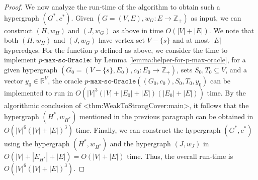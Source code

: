 \documentclass{article}
\def\Cref#1{<#1>}%
\newcommand{\functionMaximizationOracleStrongCover}[1]{\ensuremath{{#1}\text{-}\mathtt{max}\text{-}\mathtt{sc}\text{-}\mathtt{Oracle}}\xspace}
\providecommand{\Z}{\mathbb{Z}}
\providecommand{\R}{\mathbb{R}}
\begin{document}
\begin{proof}
   We now analyze the run-time of the algorithm to obtain such a hypergraph $(G^*, c^*)$. Given $(G=(V, E), w_G: E\rightarrow \Z_+)$ as input, we can construct $(H, w_H)$ and $(J, w_G)$ as above in time $O(|V| + |E|)$. We note that both $(H, w_H)$ and $(J, w_G)$ have vertex set $V-\{s\}$ and at most $|E|$ hyperedges. For the function $p$ defined as above, we consider the time to implement \functionMaximizationOracleStrongCover{p}: by Lemma \ref{lemma:helper-for-p-max-oracle}, for a given hypergraph $(G_0=(V-\{s\}, E_0), c_0: E_0\rightarrow \Z_+)$, sets $S_0, T_0\subseteq V$, and a vector $y_0\in \R^V$, the oracle \functionMaximizationOracleStrongCover{p}$((G_0, c_0), S_0, T_0, y_0)$ can be implemented to run in $O(|V|^3(|V|+|E_0|+|E|)(|E_0|+|E|))$ time. By the algorithmic conclusion of \Cref{thm:WeakToStrongCover:main}, it follows that the hypergraph $(H^*, w_{H^*})$ mentioned in the previous paragraph can be obtained in $O(|V|^6(|V|+|E|)^3)$ time. Finally, we can construct the hypergraph $(G^*, c^*)$ using the hypergraph $(H^*, w_{H^*})$ and the hypergraph $(J, w_J)$ in $O(|V|+|E_{H^*}|+|E|)=O(|V|+|E|)$ time. Thus, the overall run-time is $O(|V|^6(|V|+|E|)^3)$.
\end{proof}
\end{document}
